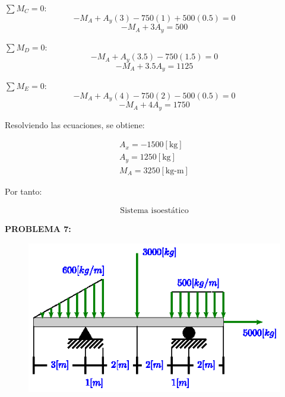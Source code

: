 \documentclass[letter,10pt,twoside]{article}
\begin{document}
$\sum{M_C} = 0$:
\begin{equation*}
    - M_A + A_y(3) - 750(1) + 500(0.5) = 0
\end{equation*}
\begin{equation*}
    - M_A + 3 A_y = 500
\end{equation*}

$\sum{M_D} = 0$:
\begin{equation*}
    - M_A + A_y(3.5) - 750(1.5) = 0
\end{equation*}
\begin{equation*}
    - M_A + 3.5 A_y = 1125
\end{equation*}

$\sum{M_E} = 0$:
\begin{equation*}
    - M_A + A_y(4) - 750(2) - 500(0.5) = 0
\end{equation*}
\begin{equation*}
    - M_A + 4 A_y = 1750
\end{equation*}

Resolviendo las ecuaciones, se obtiene:

\begin{equation*}
\boxed{
    \begin{array}{l}
        A_x = -1500[\text{kg}] \\
        A_y = 1250[\text{kg}] \\
        M_A = 3250[\text{kg-m}]
    \end{array}
}
\end{equation*}

Por tanto:

\begin{equation*}
\boxed{
    \begin{array}{l}
        \text{Sistema isoestático}
    \end{array}
}
\end{equation*}

\vspace{1.0cm}

\colorbox{blue!25}{\textbf{PROBLEMA 7:}}

\begin{figure}[H]
\centering
\includegraphics[scale=1.8]{resources/f07.eps}
\end{figure}
\end{document}
